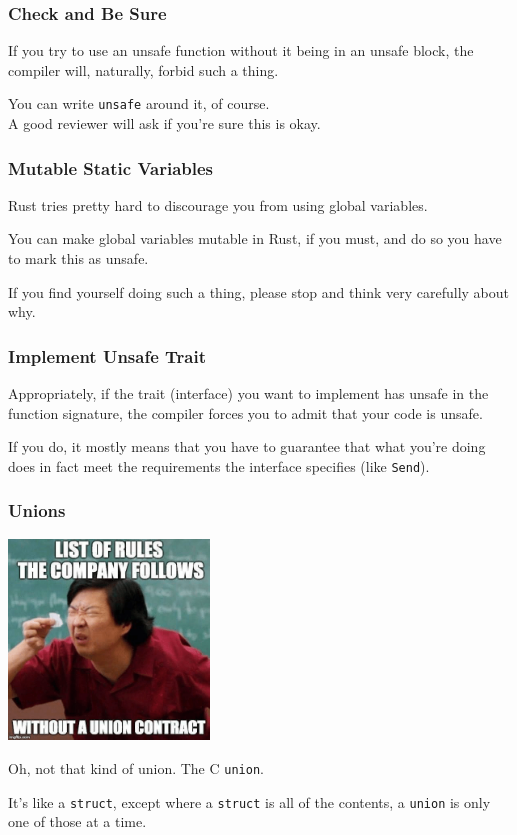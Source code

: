 \begin{frame}
\frametitle{Check and Be Sure}

If you try to use an unsafe function without it being in an unsafe block, the compiler will, naturally, forbid such a thing.

You can write \texttt{unsafe} around it, of course.\\
\quad A good reviewer will ask if you're sure this is okay.


\end{frame}


\begin{frame}
\frametitle{Mutable Static Variables}

Rust tries pretty hard to discourage you from using global variables.

You can make global variables mutable in Rust, if you must, and do so you have to mark this as unsafe. 

If you find yourself doing such a thing, please stop and think very carefully about why.


\end{frame}

\begin{frame}
\frametitle{Implement Unsafe Trait}

Appropriately, if the trait (interface) you want to implement has unsafe in the function signature, the compiler forces you to admit that your code is unsafe.

 If you do, it mostly means that you have to guarantee that what you're doing does in fact meet the requirements the interface specifies (like \texttt{Send}).

\end{frame}

\begin{frame}
\frametitle{Unions}
\begin{center}
	\includegraphics[width=0.4\textwidth]{images/union.png}
\end{center}

Oh, not that kind of union. The C \texttt{union}.

It's like a \texttt{struct}, except where a \texttt{struct} is all of the contents, a \texttt{union} is only one of those at a time.

\end{frame}



